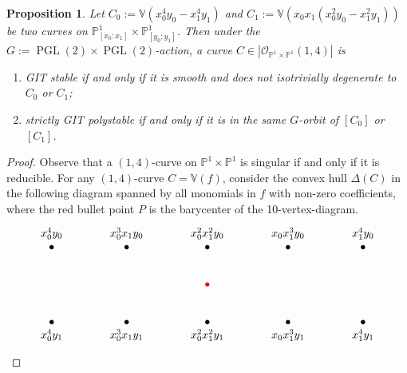\documentclass[a4paper,12pt]{amsart}
\newcommand{\mtc}[1]{\mathcal{#1}}
\DeclareMathOperator{\PGL}{PGL}
\newcommand{\bV}{{\mathbb V}}
\newcommand{\bP}{{\mathbb P}}
\newtheorem{prop}[theorem]{Proposition}
\theoremstyle{definition}
\theoremstyle{remark}
\begin{document}
\begin{prop}\label{prop:classification of GIT}
   Let $C_0:=\bV(x_0^4y_0-x_1^4y_1)$ and $C_1:=\bV(x_0x_1(x_0^2y_0-x_1^2y_1))$ be two curves on $\bP^1_{[x_0:x_1]}\times\bP^1_{[y_0:y_1]}$. Then under the $G:=\PGL(2)\times\PGL(2)$-action, a curve $C\in |\mtc{O}_{\bP^1\times\bP^1}(1,4)|$ is
   \begin{enumerate}
       \item GIT stable if and only if it is smooth and does not isotrivially degenerate to $C_0$ or $C_1$;
       \item strictly GIT polystable if and only if it is in the same $G$-orbit of $[C_0]$ or $[C_1]$.
   \end{enumerate}  
\end{prop}

\begin{proof}
    Observe that a $(1,4)$-curve on $\bP^1\times\bP^1$ is singular if and only if it is reducible. For any $(1,4)$-curve $C=\bV(f)$, consider the convex hull $\Delta(C)$ in the following diagram spanned by all monomials in $f$ with non-zero coefficients, where the red bullet point $P$ is the barycenter of the 10-vertex-diagram. 
    \[\begin{tikzcd}
	\begin{array}{c}  x_0^4y_0 \\ \bullet \end{array} & \begin{array}{c}  x_0^3x_1y_0 \\ \bullet \end{array} & \begin{array}{c}  x_0^2x_1^2y_0 \\ \bullet \end{array} & \begin{array}{c}  x_0x_1^3y_0 \\ \bullet \end{array} & \begin{array}{c}  x_1^4y_0 \\ \bullet \end{array} \\
	&& {\color{red}{\bullet}} \\
	\begin{array}{c} \bullet \\ x_0^4y_1 \end{array} & \begin{array}{c} \bullet \\ x_0^3x_1y_1 \end{array} & \begin{array}{c} \bullet \\ x_0^2x_1^2y_1 \end{array} & \begin{array}{c} \bullet \\ x_0x_1^3y_1 \end{array} & \begin{array}{c} \bullet \\ x_1^4y_1 \end{array}

\end{tikzcd}\]
\end{proof}
\end{document}
